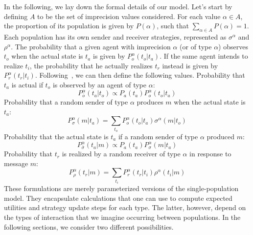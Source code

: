 \documentclass[a4paper]{article}
\begin{document}
In the following, we lay down the formal details of our model.
Let's start by defining $A$ to be the set of imprecision values considered.
For each value $\alpha \in A$, the proportion of its population is given by $P(\alpha)$, such that $\sum_{\alpha \in A} P(\alpha) = 1$.
Each population has its own sender and receiver strategies, represented as $\sigma^\alpha$ and $\rho^\alpha$.
The probability that a given agent with imprecision $\alpha$ (or of type $\alpha$) observes $t_o$ when the actual state is $t_a$ is given by $P_{o}^{\alpha}(t_{o}|t_{a})$.
If the same agent intends to realize $t_i$, the probability that he actually realizes $t_r$ instead is given by $P_{r}^{\alpha}(t_{r}|t_{i})$.
Following~\textcite[26]{franke_vagueness_2017}, we can then define the following values.
Probability that $t_a$ is actual if $t_o$ is observed by an agent of type $\alpha$:
$$
P_{\bar{o}}^{\alpha}(t_{a}|t_{o})\propto P_{a}(t_{a})P_{o}^{\alpha}(t_{o}|t_{a})
$$
Probability that a random sender of type $\alpha$ produces $m$ when the actual state is $t_a$:
$$
P_{\sigma}^{\alpha}(m|t_{a})=\sum_{t_{o}}P_{o}^{\alpha}(t_{o}|t_{a})\sigma^{\alpha}(m|t_{o})
$$
Probability that the actual state is $t_a$ if a random sender of type $\alpha$ produced $m$:
$$
P_{\bar{\sigma}}^{\alpha}(t_{a}|m)\propto P_{a}(t_{a})P_{\sigma}^{\alpha}(m|t_{a})
$$
Probability that $t_r$ is realized by a random receiver of type $\alpha$ in response to message $m$:
$$
P_{\rho}^{\alpha}(t_{r}|m)=\sum_{t_{i}}P_{r}^{\alpha}(t_{r}|t_{i})\rho^{\alpha}(t_{i}|m)
$$
These formulations are merely parameterized versions of the single-population model.
They encapsulate calculations that one can use to compute expected utilities and strategy update steps for each type.
The latter, however, depend on the types of interaction that we imagine occurring between populations.
In the following sections, we consider two different possibilities.
\end{document}
